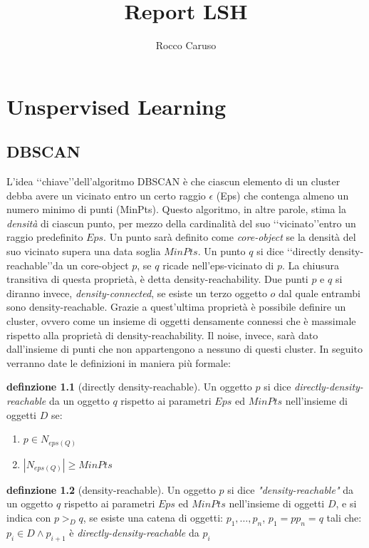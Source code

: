 \documentclass[a4paper,12pt]{report}
\title{Report LSH}
\author{Rocco Caruso}
\begin{document}
\theoremstyle{definition}
\newtheorem{definizione}{definzione}
\newtheorem{teorema}{Teorema}
\maketitle
\graphicspath{ {./immagini/} }%
 \theoremstyle{plain}
 
 
\chapter{Unspervised Learning}
\section{DBSCAN}
L'idea \lq\lq chiave\rq\rq dell'algoritmo DBSCAN\cite{Ester96adensity} è che ciascun elemento di un cluster debba avere un vicinato entro un certo raggio $\epsilon$ (Eps)  che contenga almeno un numero minimo di punti (MinPts). Questo algoritmo, in altre parole, stima la \emph{densità} di ciascun punto, per mezzo della cardinalità del suo \lq\lq vicinato\rq\rq entro un raggio predefinito $Eps$. Un punto sarà definito come \emph{core-object} se la densità del suo vicinato supera una data soglia $MinPts$.
Un punto $q$ si dice \lq\lq directly density-reachable\rq\rq  da un core-object $p$, se $q$ ricade nell'eps-vicinato di $p$.
La chiusura transitiva  di questa proprietà, è detta density-reachability. Due punti $p$ e $q$ si diranno invece, \emph{density-connected}, se esiste un terzo oggetto $o$ dal quale entrambi sono density-reachable. Grazie a quest'ultima proprietà è possibile definire un cluster, ovvero come un insieme di oggetti densamente connessi che è massimale rispetto alla proprietà di density-reachability. Il noise, invece, sarà dato dall'insieme di punti che non appartengono a nessuno di questi cluster.  In seguito verranno date le definizioni in maniera più formale:
\begin{definizione}[directly density-reachable]
\label{def:ddr}
Un oggetto $p$ si dice 	\emph{directly-density-reachable} da un oggetto $q$ rispetto ai parametri $Eps$ ed $MinPts$ nell'insieme di oggetti $D$ se:
\begin{enumerate}
\item $p \in N_{eps(Q)}$
\item $|N_{eps(Q)}| \ge MinPts$
\end{enumerate}
\end{definizione}
\begin{definizione}[density-reachable]
\label{def:dr} 
Un oggetto   $p$ si dice 	\emph{"density-reachable"} da un oggetto $q$ rispetto ai parametri $Eps$ ed $MinPts$ nell'insieme di oggetti $D$, e si  indica con \emph{$p>_{D}q$}, se esiste una catena di oggetti: $p_1,\dots,p_n$, $p_1=p p_n=q$ tali che:  $p_{i} \in D  \land p_{i+1}$ è \emph{directly-density-reachable} da $p_{i}$
\end{definizione}
\end{document}
